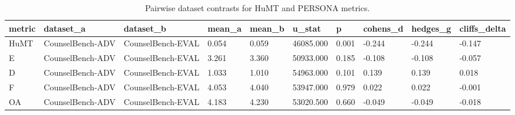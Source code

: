 \begin{table}[t]
\centering
\caption{Pairwise dataset contrasts for HuMT and PERSONA metrics.}
\label{tab:adv_pairwise}
\begin{tabular}{llllllllll}
\toprule
metric & dataset\_a & dataset\_b & mean\_a & mean\_b & u\_stat & p & cohens\_d & hedges\_g & cliffs\_delta \\
\midrule
HuMT & CounselBench-ADV & CounselBench-EVAL & 0.054 & 0.059 & 46085.000 & 0.001 & -0.244 & -0.244 & -0.147 \\
E & CounselBench-ADV & CounselBench-EVAL & 3.261 & 3.360 & 50933.000 & 0.185 & -0.108 & -0.108 & -0.057 \\
D & CounselBench-ADV & CounselBench-EVAL & 1.033 & 1.010 & 54963.000 & 0.101 & 0.139 & 0.139 & 0.018 \\
F & CounselBench-ADV & CounselBench-EVAL & 4.053 & 4.040 & 53947.000 & 0.979 & 0.022 & 0.022 & -0.001 \\
OA & CounselBench-ADV & CounselBench-EVAL & 4.183 & 4.230 & 53020.500 & 0.660 & -0.049 & -0.049 & -0.018 \\
\bottomrule
\end{tabular}
\end{table}
